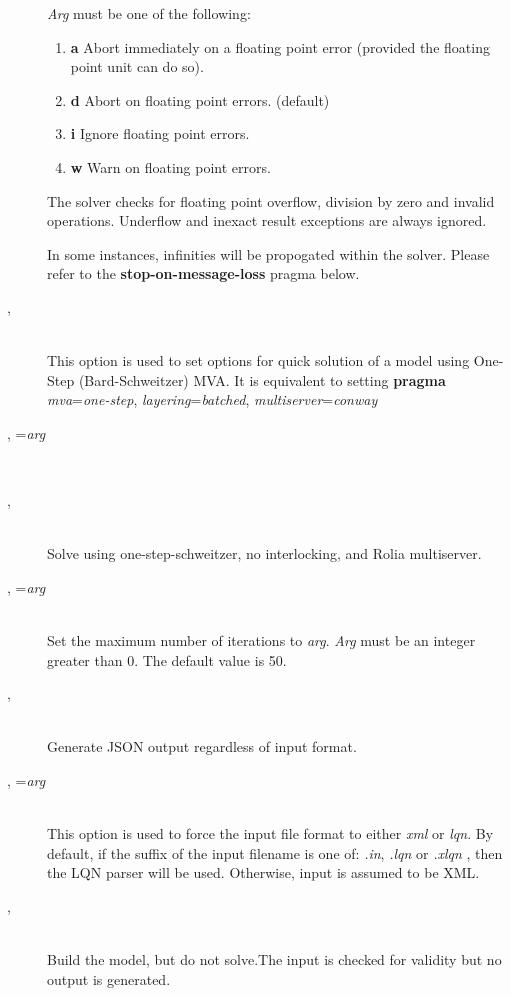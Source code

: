 \begin{description}
\emph{Arg} must be one of the following:
\begin{enumerate}
\item \textbf{a}
Abort immediately on a floating point error (provided the floating point unit can do so).
\item \textbf{d}
Abort on floating point errors. (default)
\item \textbf{i}
Ignore floating point errors.
\item \textbf{w}
Warn on floating point errors.
\end{enumerate}
The solver checks for floating point overflow, division by zero and invalid operations.
Underflow and inexact result exceptions are always ignored.


In some instances, infinities  will be propogated within the solver.  Please refer to the
\textbf{stop-on-message-loss} pragma below.
\item[\flag{f}{}, \longopt{fast}]~\\
This option is used to set options for quick solution of a model using One-Step (Bard-Schweitzer) MVA.
It is equivalent to setting \textbf{pragma} \emph{mva}=\emph{one-step}, \emph{layering}=\emph{batched}, \emph{multiserver}=\emph{conway}
\item[\flag{H}{}, \longopt{help}=\emph{arg}]~\\
\item[\flag{h}{}, \longopt{huge}]~\\
Solve using one-step-schweitzer, no interlocking, and Rolia multiserver.
\item[\flag{i}{}, \longopt{iteration-limit}=\emph{arg}]~\\
Set the maximum number of iterations to \emph{arg}.
\emph{Arg} must be an integer greater than 0.  The default value is 50.
\item[\flag{j}{}, \longopt{json}]~\\
Generate JSON output regardless of input format.
\item[\flag{I}{}, \longopt{input-format}=\emph{arg}]~\\
This option is used to force the input file format to either \emph{xml} or \emph{lqn}.
By default, if the suffix of the input filename is one of: \emph{.in}, \emph{.lqn} or \emph{.xlqn}
, then the LQN parser will be used.  Otherwise, input is assumed to be XML.
\item[\flag{n}{}, \longopt{no-execute}]~\\
Build the model, but do not solve.The input is checked for validity but no output is generated.

\end{description}
